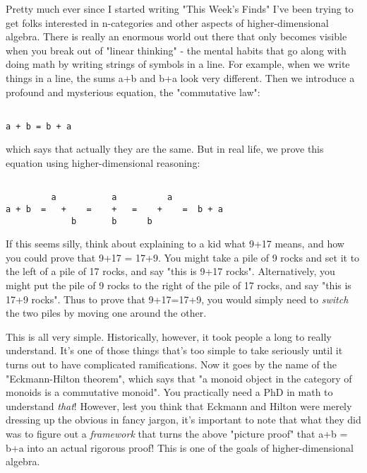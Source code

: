 

Pretty much ever since I started writing "This Week's Finds" I've been
trying to get folks interested in n-categories and other aspects of
higher-dimensional algebra.  There is really an enormous world out
there that only becomes visible when you break out of "linear
thinking" - the mental habits that go along with doing math by writing
strings of symbols in a line.  For example, when we write things in a
line, the sums a+b and b+a look very different.  Then we introduce
a profound and mysterious equation, the "commutative law":


\begin{verbatim}

a + b = b + a
\end{verbatim}
    
which says that actually they are the same.  But in real life,
we prove this equation using higher-dimensional reasoning:
          

\begin{verbatim}

         a           a          a
a + b  =   +    =    +   =    +    =  b + a
             b       b      b
\end{verbatim}
    

If this seems silly, think about explaining to a kid what 9+17 means,
and how you could prove that 9+17 = 17+9.  You might take a pile of 9
rocks and set it to the left of a pile of 17 rocks, and say "this is
9+17 rocks".  Alternatively, you might put the pile of 9 rocks to the
right of the pile of 17 rocks, and say "this is 17+9 rocks".  Thus to
prove that 9+17=17+9, you would simply need to \emph{switch} the two piles
by moving one around the other.  

This is all very simple.  Historically, however, it took people a long
to really understand.  It's one of those things that's too simple to
take seriously until it turns out to have complicated ramifications.
Now it goes by the name of the "Eckmann-Hilton theorem", which says
that "a monoid object in the category of monoids is a commutative
monoid".  You practically need a PhD in math to understand \emph{that}!
However, lest you think that Eckmann and Hilton were merely dressing
up the obvious in fancy jargon, it's important to note that what they
did was to figure out a \emph{framework} that turns the above "picture
proof" that a+b = b+a into an actual rigorous proof!  This is one of
the goals of higher-dimensional algebra.

